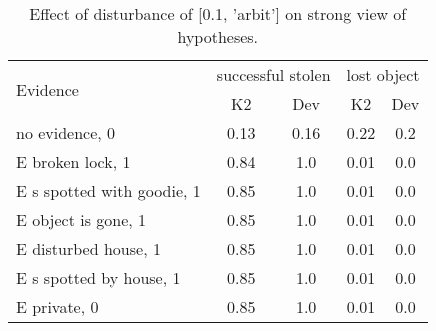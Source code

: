 \begin{table}\begin{tabular}{l|cc|cc}\toprule\multirow{2}{*}{Evidence} & \multicolumn{2}{c}{successful stolen}& \multicolumn{2}{c}{lost object}\\& {K2} & {Dev}& {K2} & {Dev}\\\midrule
no evidence, 0 & 0.13&0.16&0.22&0.2\\E broken lock, 1 & \cellcolor{Bittersweet}0.84&\cellcolor{Bittersweet}1.0&0.01&0.0\\E s spotted with goodie, 1 & \cellcolor{Bittersweet}0.85&\cellcolor{Bittersweet}1.0&0.01&0.0\\E object is gone, 1 & \cellcolor{Bittersweet}0.85&\cellcolor{Bittersweet}1.0&0.01&0.0\\E disturbed house, 1 & \cellcolor{Bittersweet}0.85&\cellcolor{Bittersweet}1.0&0.01&0.0\\E s spotted by house, 1 & \cellcolor{Bittersweet}0.85&\cellcolor{Bittersweet}1.0&0.01&0.0\\E private, 0 & \cellcolor{Bittersweet}0.85&\cellcolor{Bittersweet}1.0&0.01&0.0\\\bottomrule\end{tabular}\caption{Effect of disturbance of [0.1, 'arbit'] on strong view of hypotheses.}\end{table}